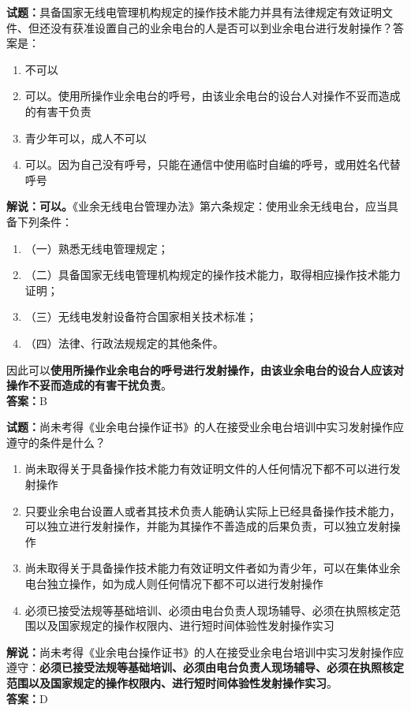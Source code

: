 \documentclass{ctexbook}
\begin{document}
\bigskip


\noindent\textbf{试题：}具备国家无线电管理机构规定的操作技术能力并具有法律规定有效证明文件、但还没有获准设置自己的业余电台的人是否可以到业余电台进行发射操作？答案是：
\begin{enumerate}[leftmargin=3em]
\item 不可以
\item 可以。使用所操作业余电台的呼号，由该业余电台的设台人对操作不妥而造成的有害干负责
\item 青少年可以，成人不可以
\item 可以。因为自己没有呼号，只能在通信中使用临时自编的呼号，或用姓名代替呼号
\end{enumerate}
\noindent\textbf{解说：可以。}《业余无线电台管理办法》第六条规定：使用业余无线电台，应当具备下列条件：
\begin{enumerate}[label=, leftmargin=0.8em]
\item （一）熟悉无线电管理规定；
\item （二）具备国家无线电管理机构规定的操作技术能力，取得相应操作技术能力证明；
\item （三）无线电发射设备符合国家相关技术标准；
\item （四）法律、行政法规规定的其他条件。
\end{enumerate}
因此可以\textbf{使用所操作业余电台的呼号进行发射操作，由该业余电台的设台人应该对操作不妥而造成的有害干扰负责}。\\\noindent\textbf{答案：}B



\bigskip


\noindent\textbf{试题：}尚未考得《业余电台操作证书》的人在接受业余电台培训中实习发射操作应遵守的条件是什么？
\begin{enumerate}[leftmargin=3em]
\item 尚未取得关于具备操作技术能力有效证明文件的人任何情况下都不可以进行发射操作
\item 只要业余电台设置人或者其技术负责人能确认实际上已经具备操作技术能力，可以独立进行发射操作，并能为其操作不善造成的后果负责，可以独立发射操作
\item 尚未取得关于具备操作技术能力有效证明文件者如为青少年，可以在集体业余电台独立操作，如为成人则任何情况下都不可以进行发射操作
\item 必须已接受法规等基础培训、必须由电台负责人现场辅导、必须在执照核定范围以及国家规定的操作权限内、进行短时间体验性发射操作实习
\end{enumerate}
\noindent\textbf{解说：}尚未考得《业余电台操作证书》的人在接受业余电台培训中实习发射操作应遵守：\textbf{必须已接受法规等基础培训、必须由电台负责人现场辅导、必须在执照核定范围以及国家规定的操作权限内、进行短时间体验性发射操作实习}。\\\noindent\textbf{答案：}D
\end{document}
